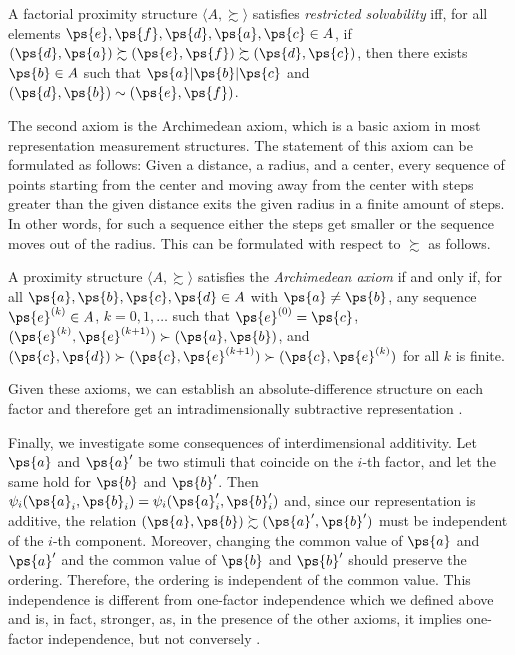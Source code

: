\begin{ax} \label{defi-restrict-solv}
A factorial proximity structure $\langle A, \succsim \rangle$ satisfies \emph{restricted solvability} iff, for all elements $\ps{e}, \ps{f}, \ps{d}, \ps{a}, \ps{c} \in A$, if $(\ps{d}, \ps{a}) \succsim (\ps{e}, \ps{f}) \succsim (\ps{d}, \ps{c})$, then there exists $\ps{b} \in A$ such that $\ps{a}|\ps{b}|\ps{c}$ and $(\ps{d}, \ps{b}) \sim (\ps{e}, \ps{f})$.
\end{ax}

The second axiom is the Archimedean axiom, which is a basic axiom in most representation measurement structures.
The statement of this axiom can be formulated as follows: Given a distance, a radius, and a center, every sequence of points starting from the center and moving away from the center with steps greater than the given distance exits the given radius in a finite amount of steps.
In other words, for such a sequence either the steps get smaller or the sequence moves out of the radius.
This can be formulated with respect to $\succsim$ as follows.

\begin{ax} \label{def-archimed-ax-adm}
A proximity structure $\langle A, \succsim \rangle$ satisfies the \emph{Archimedean axiom} if and only if, for all $\ps{a}, \ps{b}, \ps{c}, \ps{d} \in A$ with $\ps{a} \neq \ps{b}$, any sequence $\ps{e}^{(k)} \in A$, $k = 0, 1, \ldots$ such that $\ps{e}^{(0)} = \ps{c}$, $(\ps{e}^{(k)}, \ps{e}^{(k+1)}) \succ (\ps{a}, \ps{b})$, and $(\ps{c}, \ps{d}) \succ (\ps{c}, \ps{e}^{(k+1)}) \succ (\ps{c}, \ps{e}^{(k)})$ for all $k$ is finite.
\end{ax}

Given these axioms, we can establish an absolute-difference structure on each factor and therefore get an intradimensionally subtractive representation \parencite[p. 181]{foundations2}.

Finally, we investigate some consequences of interdimensional additivity.
Let $\ps{a}$ and $\ps{a}'$ be two stimuli that coincide on the $i$-th factor, and let the same hold for $\ps{b}$ and $\ps{b}'$. Then $\psi_i(\ps{a}_i, \ps{b}_i) = \psi_i(\ps{a}'_i, \ps{b}'_i)$ and, since our representation is additive, the relation $(\ps{a}, \ps{b}) \succsim (\ps{a}', \ps{b}')$ must be independent of the $i$-th component.
Moreover, changing the common value of $\ps{a}$ and $\ps{a}'$ and the common value of $\ps{b}$ and $\ps{b}'$ should preserve the ordering.
Therefore, the ordering is independent of the common value.
This independence is different from one-factor independence which we defined above and is, in fact, stronger, as, in the presence of the other axioms, it implies one-factor independence, but not conversely \parencite[p. 184]{foundations2}.

